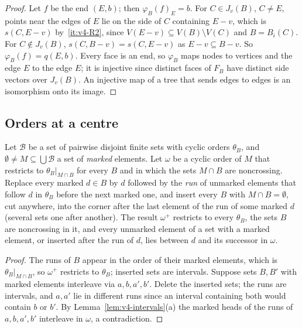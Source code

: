 \begin{proof}
Let $f$ be the end $(E,b)$; then $\varphi_B(f)_E=b$. For $C\in J_v(B)$,
$C\neq E$, points near the edges of $E$ lie on the side of $C$ containing
$E-v$, which is $s(C,E-v)$ by~\ref{it:v4-R2}, since $V(E-v)\subseteq
V(B)\setminus V(C)$ and $B=B_i(C)$. For $C\notin J_v(B)$,
$s(C,B-v)=s(C,E-v)$ as $E-v\subseteq B-v$. So $\varphi_B(f)=q(E,b)$. Every
face is an end, so $\varphi_B$ maps nodes to vertices and the edge $E$ to the
edge $E$; it is injective since distinct faces of $F_B$ have distinct side
vectors over $J_v(B)$. An injective map of a tree that sends edges to edges
is an isomorphism onto its image.
\end{proof}

\subsection{Orders at a centre}\label{sec:v4-centre}

\begin{lemma}\label{lem:v4-runs}
Let $\mathcal B$ be a set of pairwise disjoint finite sets with cyclic orders
$\theta_B$, and $\emptyset\ne M\subseteq\bigcup\mathcal B$ a set of
\emph{marked} elements. Let $\omega$ be a cyclic
order of $M$ that restricts to $\theta_B|_{M\cap B}$ for every $B$ and in
which the sets $M\cap B$ are noncrossing. Replace every marked $d\in B$ by
$d$ followed by the \emph{run} of unmarked elements that follow $d$ in
$\theta_B$ before the next marked one, and insert every $B$ with $M\cap
B=\emptyset$, cut anywhere, into the corner after the last element of the
run of some marked $d$ (several sets one after another). The result $\omega^+$ restricts to every $\theta_B$, the
sets $B$ are noncrossing in it, and every unmarked element of a set with a
marked element, or inserted after the run of $d$, lies between $d$ and its
successor in $\omega$.
\end{lemma}

\begin{proof}
The runs of $B$ appear in the order of their marked elements, which is
$\theta_B|_{M\cap B}$, so $\omega^+$ restricts to $\theta_B$; inserted sets
are intervals. Suppose sets $B,B'$ with marked elements interleave via
$a,b,a',b'$. Delete the inserted sets; the runs are intervals, and $a,a'$
lie in different runs since an interval containing both would contain $b$
or $b'$. By Lemma~\ref{lem:v4-intervals}(a) the marked heads of the runs of
$a,b,a',b'$ interleave in $\omega$, a contradiction.
\end{proof}

